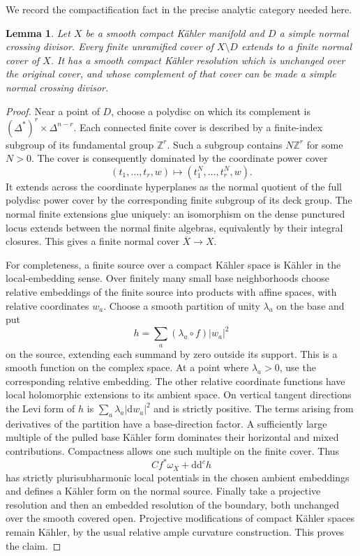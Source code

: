 \documentclass[11pt,letterpaper]{article}
\newtheorem{lemma}[theorem]{Lemma}
\theoremstyle{definition}
\theoremstyle{remark}
\begin{document}
We record the compactification fact in the precise analytic category
needed here.

\begin{lemma}\label{fol:cover-compactification}
Let $X$ be a smooth compact K\"ahler manifold and $D$ a simple normal
crossing divisor.  Every finite unramified cover of $X\setminus D$
extends to a finite normal cover of $X$.  It has a smooth compact
K\"ahler resolution which is unchanged over the original cover, and
whose complement of that cover can be made a simple normal crossing
divisor.
\end{lemma}

\begin{proof}
Near a point of $D$, choose a polydisc on which its complement is
$(\Delta^*)^r\times\Delta^{n-r}$.  Each connected finite cover is
described by a finite-index subgroup of its fundamental group
$\mathbb{Z}^r$.  Such a subgroup contains $N\mathbb{Z}^r$ for some $N>0$.
The cover is consequently dominated by the coordinate power cover
\[
 (t_1,\ldots,t_r,w)\longmapsto(t_1^N,\ldots,t_r^N,w).
\]
It extends across the coordinate hyperplanes as the normal quotient
of the full polydisc power cover by the corresponding finite subgroup
of its deck group.  The normal finite extensions glue uniquely:
an isomorphism on the dense punctured locus extends between the
normal finite algebras, equivalently by their integral closures.
This gives a finite normal cover $\overline X\to X$.

For completeness, a finite source over a compact K\"ahler space is
K\"ahler in the local-embedding sense.  Over finitely many small base
neighborhoods choose relative embeddings of the finite source into
products with affine spaces, with relative coordinates $w_a$.
Choose a smooth partition of unity $\lambda_a$ on the base and put
\[
 h=\sum_a(\lambda_a\circ f)|w_a|^2
\]
on the source, extending each summand by zero outside its support.
This is a smooth function on the complex space.  At a point where
$\lambda_a>0$, use the corresponding relative embedding.
The other relative coordinate functions have local holomorphic
extensions to its ambient space.  On vertical tangent directions the
Levi form of $h$ is
$\sum_a\lambda_a|\mathrm{d} w_a|^2$ and is strictly positive.  The terms
arising from derivatives of the partition have a base-direction
factor.  A sufficiently large multiple of the pulled base K\"ahler
form dominates their horizontal and mixed contributions.  Compactness
allows one such multiple on the finite cover.  Thus
\[
 C f^*\omega_X+\mathrm{d}\mathrm{d}^{c} h
\]
has strictly plurisubharmonic local potentials in the chosen ambient
embeddings and defines a K\"ahler form on the normal source.
Finally take a projective resolution and then an embedded resolution
of the boundary, both unchanged over the smooth covered open.
Projective modifications of compact K\"ahler spaces remain K\"ahler,
by the usual relative ample curvature construction.  This proves the
claim.
\end{proof}
\end{document}
